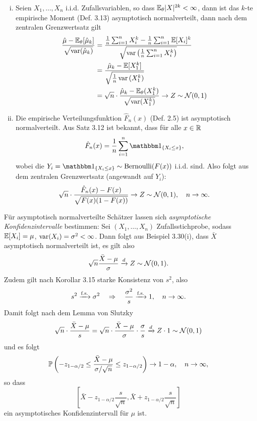 \begin{exmp}
  \begin{enumerate}[(i)]
  \item Seien $X_1, \ldots, X_n$ i.i.d. Zufallsvariablen, so dass
    $\mathbb{E}_\theta|X|^{2k} < \infty$, dann ist das $k$-te empirische Moment (Def.
    3.13) asymptotisch normalverteilt, dann nach dem zentralen Grenzwertsatz
    gilt
    \begin{align*}
      \frac{\hat{\mu} - \mathbb{E}_\theta[\hat{\mu}_k]}{\sqrt{\operatorname{var} (\hat{\mu}_k)}}
      &= \frac{\frac{1}{n} \sum_{i=1}^n X_i^k - \frac{1}{n} \sum_{i=1}^n \mathbb{E}[X_i]^k}
      {\sqrt{\operatorname{var} \left( \frac{1}{n} \sum_{i=1}^n X_i^k \right)}} \\
      &= \frac{\hat{\mu}_k - \mathbb{E}[X_1^k]}{\sqrt{\frac{1}{n} \operatorname{var}{(X_1^k)}}} \\
      &= \sqrt{n} \cdot \frac{\hat{\mu}_k - \mathbb{E}_\theta(X_1^k)}{\sqrt{\operatorname{var}(X_1^k)}}
        \to Z \sim \mathcal{N}(0,1)
    \end{align*}
  \item Die empirische Verteilungsfunktion $\hat{F}_n(x)$ (Def. 2.5) ist
    asymptotisch normalverteilt. Aus Satz 3.12 ist bekannt, dass für alle $x \in
    \mathbb{R}$
    \[ \hat{F}_n(x) = \rez{n} \sum_{i=1}^n \ind_{\{X_i \le x\}}, \]
    wobei die $Y_i = \ind_{\{X_i \le x\}} \sim \mathrm{Bernoulli}(F(x))$ i.i.d.
    sind. Also folgt aus dem zentralen Grenzwertsatz (angewandt auf $Y_i$):
    \[ \sqrt{n} \cdot \frac{\hat{F}_n(x) - F(x)}{\sqrt{F(x)(1-F(x))}}
    \to Z \sim \mathcal{N}(0,1), \quad n \to \infty. \]
  \end{enumerate}
\end{exmp}

\begin{rmrk}
  Für asymptotisch normalverteilte Schätzer lassen sich \emph{asymptotische
    Konfidenzintervalle} bestimmen: Sei $(X_1, \ldots, X_n)$ Zufallsstichprobe,
  sodass $\mathbb{E}[X_i] = \mu$, $\operatorname{var}(X_i) = \sigma^2 < \infty$. Dann folgt aus
  Beispiel 3.30(i), dass $\bar{X}$ asymptotisch normalverteilt ist, es gilt also
  \[ \sqrt{n} \frac{\bar{X} - \mu}{\sigma} \xrightarrow{d} Z \sim
    \mathcal{N}(0,1). \]
  Zudem gilt nach Korollar 3.15 starke Konsistenz von $s^2$, also
  \[ s^2 \xrightarrow{\text{f.s.}} \sigma^2 \quad \Rightarrow \quad
    \frac{\sigma^2}{s} \xrightarrow{\text{f.s.}} 1, \quad
    n \to \infty.
  \]
  Damit folgt nach dem Lemma von Slutzky
  \[ \sqrt{n} \cdot \frac{\bar{X} - \mu}{s}
    = \sqrt{n} \cdot \frac{\bar{X} - \mu}{\sigma} \cdot \frac{\sigma}{s}
    \xrightarrow{d} Z \cdot 1 \sim \mathcal{N}(0,1) \]
  und es folgt
  \[ \mathbb{P} \left( -z_{1-\alpha/2} \le
      \frac{\bar{X} - \mu}{\sigma / \sqrt{n}} \le
      z_{1-\alpha/2} \right) \to 1 - \alpha, \quad n \to \infty, \]
  so dass
  \[ \left[ \bar{X} - z_{1-\alpha/2} \frac{s}{\sqrt{n}},
      \bar{X} + z_{1-\alpha/2} \frac{s}{\sqrt{n}} \right] \]
  ein asymptotisches Konfidenzintervall für $\mu$ ist.
\end{rmrk}

